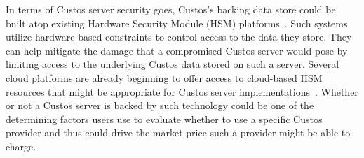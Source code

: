 In terms of Custos server security goes, Custos's backing data store
could be built atop existing Hardware Security Module (HSM)
platforms~\cite{fips140}. Such systems utilize hardware-based
constraints to control access to the data they store. They can help
mitigate the damage that a compromised Custos server would pose by
limiting access to the underlying Custos data stored on such a
server. Several cloud platforms are already beginning to offer access
to cloud-based HSM resources that might be appropriate for Custos
server implementations~\cite{amazon-hsm}. Whether or not a Custos
server is backed by such technology could be one of the determining
factors users use to evaluate whether to use a specific Custos
provider and thus could drive the market price such a provider might
be able to charge.

